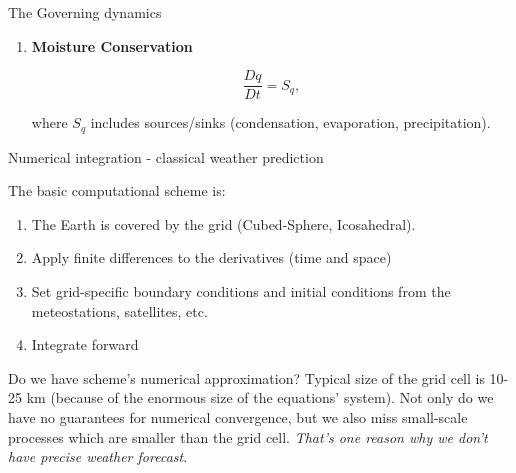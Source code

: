 \documentclass[10pt]{beamer}
\begin{document}
\begin{frame}{The Governing dynamics}
\begin{enumerate}
			where $Q$ is diabatic heating (radiation, latent heat, etc.). The diffusion term $\nabla \cdot (k \nabla T) $ is negligible relative to convection, work of expansion and external sources.
			
			\item<only@3> \textbf{Moisture Conservation}
			
			\begin{equation}
				\frac{Dq}{Dt} = S_q,
			\end{equation}
			
			where $S_q$ includes sources/sinks (condensation, evaporation, precipitation).
			
		\end{enumerate}
		
	\end{frame}
	
	\begin{frame}{Numerical integration - classical weather prediction}
		
		The basic computational scheme is:
		
		\begin{enumerate}
			\item The Earth is covered by the grid (Cubed-Sphere, Icosahedral).
			\item Apply finite differences to the derivatives (time and space)
			\item Set grid-specific boundary conditions and initial conditions from the meteostations, satellites, etc.
			\item Integrate forward
		\end{enumerate} 
		
		\begin{alertblock}{Do we have scheme's numerical approximation?}
			Typical size of the grid cell is 10-25 km (because of the enormous size of the equations' system). Not only do we have no guarantees for numerical convergence, but we also miss small-scale processes which are smaller than the grid cell. \textit{That's one reason why we don't have precise weather forecast}.
		\end{alertblock}
	
	\end{frame}
	
\end{document}
